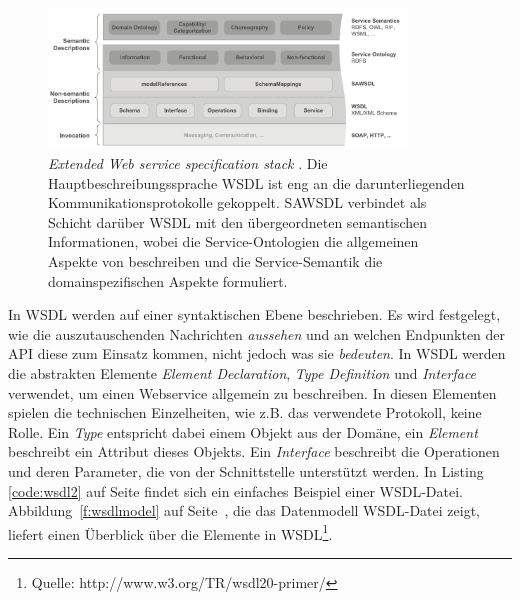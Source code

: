 \begin{figure}[ht]
\centering
\parbox{0.85\textwidth}{
    \includegraphics[width=0.85\textwidth]{media/Extended-Web-Service-Specification-Stack.pdf}
    \caption{\emph{Extended Web service specification stack} \cite[S.63]{ky-sawsdl}. Die Hauptbeschreibungssprache \ac{WSDL} ist eng an die darunterliegenden Kommunikationsprotokolle gekoppelt. \ac{SAWSDL} verbindet als Schicht darüber \ac{WSDL} mit den übergeordneten semantischen Informationen, wobei die Service-Ontologien die allgemeinen Aspekte von \ws beschreiben und die Service-Semantik die domainspezifischen Aspekte formuliert.}
    \label{f:ewsss}
}
\end{figure}

In \ac{WSDL} werden \ws auf einer syntaktischen Ebene beschrieben. Es wird festgelegt, wie die auszutauschenden Nachrichten \emph{aussehen} und an welchen Endpunkten der \ac{API} diese zum Einsatz kommen, nicht jedoch was sie \emph{bedeuten}. In \ac{WSDL} werden die abstrakten Elemente \emph{Element Declaration}, \emph{Type Definition} und \emph{Interface} verwendet, um einen Webservice allgemein zu beschreiben. In diesen Elementen spielen die technischen Einzelheiten, wie z.B. das verwendete Protokoll, keine Rolle. Ein \emph{Type} entspricht dabei einem Objekt aus der Domäne, ein \emph{Element} beschreibt ein Attribut dieses Objekts. Ein \emph{Interface} beschreibt die Operationen und deren Parameter, die von der Schnittstelle unterstützt werden. In Listing \ref{code:wsdl2} auf Seite \pageref{code:wsdl2} findet sich ein einfaches Beispiel einer \ac{WSDL}-Datei. Abbildung~\ref{f:wsdlmodel} auf Seite~\pageref{f:wsdlmodel}, die das Datenmodell \ac{WSDL}-Datei zeigt, liefert einen Überblick über die Elemente in \ac{WSDL}\footnote{Quelle: http://www.w3.org/TR/wsdl20-primer/}.


